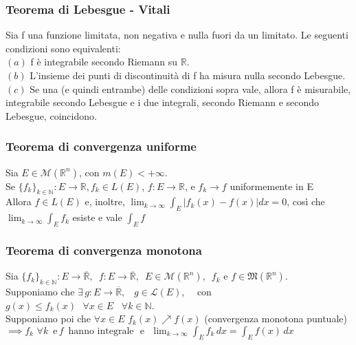 \documentclass{article} %
\begin{document}
    \subsubsection*{Teorema di Lebesgue - Vitali}
    Sia f una funzione limitata, non negativa e nulla fuori da un limitato. Le seguenti condizioni sono equivalenti: \\
    $(a)$ f è integrabile secondo Riemann su $\mathbb{R}$. \\
    $(b)$ L'insieme dei punti di discontinuità di f ha misura nulla secondo Lebesgue. \\
    $(c)$ Se una (e quindi entrambe) delle condizioni sopra vale, allora f è misurabile, integrabile secondo Lebesgue e i due integrali, secondo Riemann e secondo Lebesgue, coincidono.


    \subsubsection*{Teorema di convergenza uniforme}
    Sia $E \in \mathcal{M}(\mathbb{R}^n)$, con $m(E) < + \infty$. \\ Se $\{f_k\}_{k \in \mathbb{N}}: E \to \mathbb{R}, f_k \in L(E)$, $f:E \to \mathbb{R}$, e $f_k \to f$ uniformemente in E \\
    Allora $f \in L(E)$ e, inoltre, $\lim_{k \to \infty} \int_E \left| f_k(x) - f(x) \right|dx=0$, così che $\lim_{k \to \infty} \int_E f_k$ esiste e vale $\int_E f$


    \subsubsection*{Teorema di convergenza monotona}
    Sia $ \{ f_k \}_{k\in\mathbb{N}}: E \to \overline{\mathbb{R}}, \,\,\, f: E \to \overline{\mathbb{R}}, \,\,\, E \in \mathcal{M} (\mathbb{R} ^n) , \,\,\, f_k \text{ e } f \in \mathfrak{M}(\mathbb{R} ^n) $. \\ Supponiamo che $\exists \, g: E \to \overline{\mathbb{R}}, \,\,\,\,\, g \in \mathcal{L} (E) $, \,\,\,\, con $g(x)\leq f_k(x) \, \,\,\, \forall x \in E \, \,\,\,\, \forall k \in \mathbb{N} $. \\ Supponiamo poi che $\forall x \in E$ $f_k(x)\nearrow f(x)$ (convergenza monotona puntuale) \\
    $ \implies f_k \, \, \forall k \,\,\, \text{e} \, f \,\,\, \text{hanno integrale} \,\,\,\, \text{e} \,\,\,\, \lim_{k \to \infty} \int_{E}^{}f_k \,dx = \int_{E}^{}f(x) \,dx $
\end{document}
